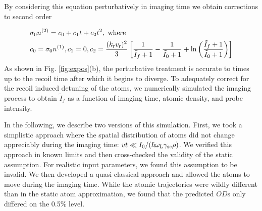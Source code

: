 \documentclass[12pt]{iopart}
\begin{document}
\par By considering this equation perturbatively in imaging time we obtain corrections to second order \cite{LJLthesis}

\begin{eqnarray}
&\sigma_0 n^{\rm{(2)}}  =  c_0+c_1t+c_2t^2, \mbox{ where } \\
 &c_0= \sigma_0 n^{\rm{(1)}}, c_1=0, c_2=\frac{( k_{\rm{r}} v_{\rm{r}})^2}{3}\left[\frac{1}{\tilde{I}_f+1}-\frac{1}{\tilde{I}_0+1}+\mathrm{ln}\left(\frac{\tilde{I}_f+1}{\tilde{I}_0+1}\right)\right]
\label{eq:OD2}
\end{eqnarray}
As shown in  Fig. \ref{fig:expos}(b), the perturbative treatment is accurate to times up to the recoil time after which it begins to diverge. To adequately correct for the recoil induced detuning of the atoms, we numerically simulated the imaging process to obtain $\tilde{I}_f$ as a function of imaging time, atomic density, and probe intensity.
\par In the following, we describe two versions of this simulation. First, we took a simplistic approach where the spatial distribution of atoms did not change appreciably during the imaging time: $vt\ll I_0/(\hbar \omega_{\rm{L}} \gamma_{\rm{sc}} \rho)$. We verified this approach in known limits and then cross-checked the validity of the static assumption. For realistic input parameters, we found this assumption to be invalid. We then developed a quasi-classical approach and allowed the atoms to move during the imaging time. While the atomic trajectories were wildly different than in the static atom approximation, we found that the predicted $OD$s only differed on the 0.5$\%$ level.
\end{document}
